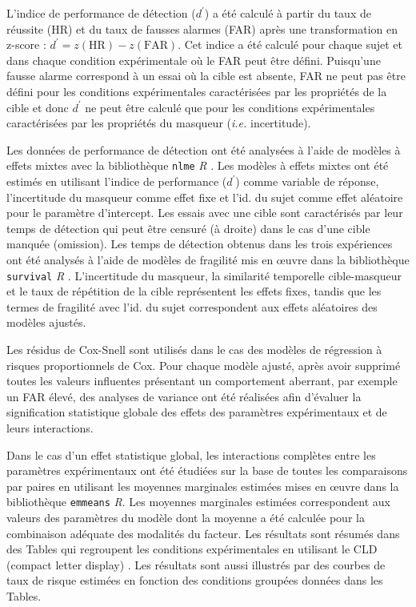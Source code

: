 L'indice de performance de détection ($d^\prime$) a été calculé à partir du taux de réussite (HR) et du taux de fausses alarmes (FAR) après une transformation en z-score \citep{green1966signal, macmillan2004detection} : $d^\prime = z(\text{HR})-z(\text{FAR})$. 
Cet indice a été calculé pour chaque sujet et dans chaque condition expérimentale où le FAR peut être défini. 
Puisqu'une fausse alarme correspond à un essai où la cible est absente, FAR ne peut pas être défini pour les conditions expérimentales caractérisées par les propriétés de la cible et donc $d^\prime$ ne peut être calculé que pour les conditions expérimentales caractérisées par les propriétés du masqueur (\textit{i.e.} incertitude).

Les données de performance de détection ont été analysées à l'aide de modèles à effets mixtes avec la bibliothèque \texttt{nlme} \textit{R} \citep{pinheiro2012nlme}. 
Les modèles à effets mixtes ont été estimés en utilisant l'indice de performance ($d^\prime$) comme variable de réponse, l'incertitude du masqueur comme effet fixe et l'id. du sujet comme effet aléatoire pour le paramètre d'intercept.
Les essais avec une cible sont caractérisés par leur temps de détection qui peut être censuré (à droite) dans le cas d'une cible manquée (omission). 
Les temps de détection obtenus dans les trois expériences ont été analysés à l'aide de modèles de fragilité mis en œuvre dans la bibliothèque \texttt{survival} \textit{R} \citep{therneau2013r}. 
L'incertitude du masqueur, la similarité temporelle cible-masqueur et le taux de répétition de la cible représentent les effets fixes, tandis que les termes de fragilité avec l'id. du sujet correspondent aux effets aléatoires des modèles ajustés. 

Les résidus de Cox-Snell \citep{cox1968general, andersen1993statistical, letue2018statistical} sont utilisés dans le cas des modèles de régression à risques proportionnels de Cox. 
Pour chaque modèle ajusté, après avoir supprimé toutes les valeurs influentes présentant un comportement aberrant, par exemple un FAR élevé, des analyses de variance ont été réalisées afin d'évaluer la signification statistique globale des effets des paramètres expérimentaux et de leurs interactions.

Dans le cas d'un effet statistique global, les interactions complètes entre les paramètres expérimentaux ont été étudiées sur la base de toutes les comparaisons par paires en utilisant les moyennes marginales estimées mises en œuvre dans la bibliothèque \texttt{emmeans} \textit{R}. 
Les moyennes marginales estimées correspondent aux valeurs des paramètres du modèle dont la moyenne a été calculée pour la combinaison adéquate des modalités du facteur. 
Les résultats sont résumés dans des Tables qui regroupent les conditions expérimentales en utilisant le CLD (compact letter display) \citep{piepho2004an}. 
Les résultats sont aussi illustrés par des courbes de taux de risque estimées en fonction des conditions groupées données dans les Tables.

